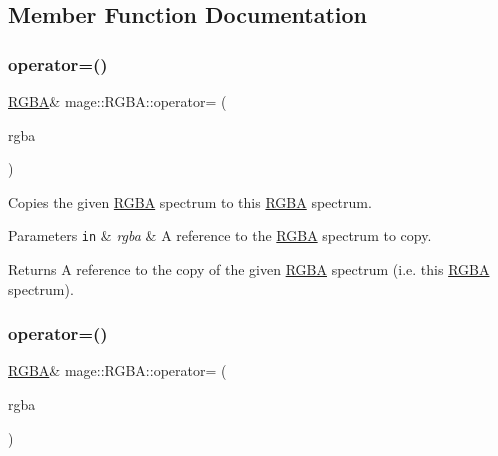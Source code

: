 \subsection{Member Function Documentation}
\hypertarget{structmage_1_1_r_g_b_a_ad98ba07626877d31e2947532eed217c4}{}\label{structmage_1_1_r_g_b_a_ad98ba07626877d31e2947532eed217c4} 
\subsubsection{\texorpdfstring{operator=()}{operator=()}\hspace{0.1cm}{\footnotesize\ttfamily [1/2]}}
{\footnotesize\ttfamily \hyperlink{structmage_1_1_r_g_b_a}{R\+G\+BA}\& mage\+::\+R\+G\+B\+A\+::operator= (\begin{DoxyParamCaption}\item[{const \hyperlink{structmage_1_1_r_g_b_a}{R\+G\+BA} \&}]{rgba }\end{DoxyParamCaption})\hspace{0.3cm}{\ttfamily [default]}}

Copies the given \hyperlink{structmage_1_1_r_g_b_a}{R\+G\+BA} spectrum to this \hyperlink{structmage_1_1_r_g_b_a}{R\+G\+BA} spectrum.


\begin{DoxyParams}[1]{Parameters}
\mbox{\tt in}  & {\em rgba} & A reference to the \hyperlink{structmage_1_1_r_g_b_a}{R\+G\+BA} spectrum to copy. \\
\hline
\end{DoxyParams}
\begin{DoxyReturn}{Returns}
A reference to the copy of the given \hyperlink{structmage_1_1_r_g_b_a}{R\+G\+BA} spectrum (i.\+e. this \hyperlink{structmage_1_1_r_g_b_a}{R\+G\+BA} spectrum). 
\end{DoxyReturn}
\hypertarget{structmage_1_1_r_g_b_a_ae3a37c24a96e02078fc804ea2fb5be63}{}\label{structmage_1_1_r_g_b_a_ae3a37c24a96e02078fc804ea2fb5be63} 
\subsubsection{\texorpdfstring{operator=()}{operator=()}\hspace{0.1cm}{\footnotesize\ttfamily [2/2]}}
{\footnotesize\ttfamily \hyperlink{structmage_1_1_r_g_b_a}{R\+G\+BA}\& mage\+::\+R\+G\+B\+A\+::operator= (\begin{DoxyParamCaption}\item[{\hyperlink{structmage_1_1_r_g_b_a}{R\+G\+BA} \&\&}]{rgba }\end{DoxyParamCaption})\hspace{0.3cm}{\ttfamily [default]}}

